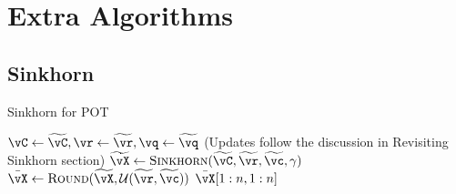 
\section{Extra Algorithms}
\subsection{Sinkhorn}
\begin{algorithm}
    \caption{Sinkhorn for POT}
    \label{alg:Sinkhorn}
    \begin{algorithmic}[1]
        \STATE $\vC \gets \widetilde{\vC}, \vr \gets \widetilde{\vr}, \vq \gets \widetilde{\vq}$ (Updates follow the discussion in Revisiting Sinkhorn section) %
        \STATE $\widetilde{\vX} \gets \textsc{Sinkhorn}(\widetilde{\vC}, \widetilde{\vr}, \widetilde{\vc}, \gamma)$
        \STATE $\bar{\vX} \gets \textsc{Round}(\widetilde{\vX}, \mathcal{U}(\widetilde{\vr}, \widetilde{\vc}))$ \citep[Algorithm 2]{altschuler2017near}
        \ENSURE $\bar{\vX}[1:n,1:n]$
    \end{algorithmic}
\end{algorithm}

